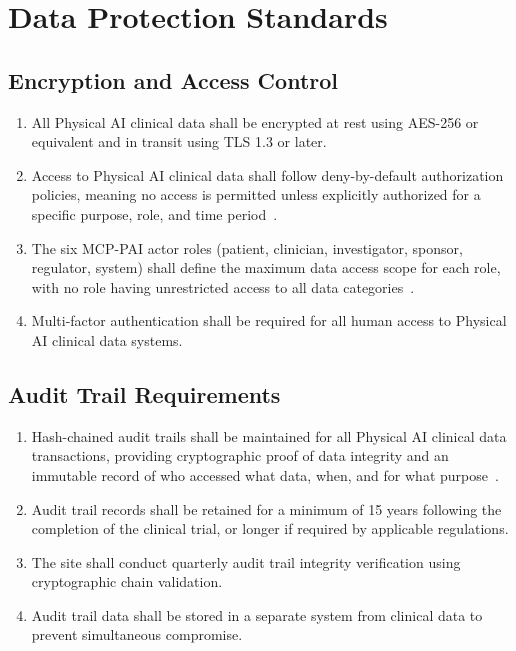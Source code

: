 \section{Data Protection Standards}

\subsection{Encryption and Access Control}

\begin{enumerate}[label=(\alph*)]
\item All Physical AI clinical data shall be encrypted at rest using AES-256 or
  equivalent and in transit using TLS 1.3 or later.

\item Access to Physical AI clinical data shall follow deny-by-default
  authorization policies, meaning no access is permitted unless explicitly
  authorized for a specific purpose, role, and time period~\cite{iche6r3adapt}.

\item The six MCP-PAI actor roles (patient, clinician, investigator, sponsor,
  regulator, system) shall define the maximum data access scope for each
  role, with no role having unrestricted access to all data
  categories~\cite{iche6r3adapt}.

\item Multi-factor authentication shall be required for all human access to
  Physical AI clinical data systems.
\end{enumerate}

\subsection{Audit Trail Requirements}

\begin{enumerate}[label=(\alph*)]
\item Hash-chained audit trails shall be maintained for all Physical AI clinical
  data transactions, providing cryptographic proof of data integrity and an
  immutable record of who accessed what data, when, and for what
  purpose~\cite{iche6r3adapt}.

\item Audit trail records shall be retained for a minimum of 15 years following
  the completion of the clinical trial, or longer if required by applicable
  regulations.

\item The site shall conduct quarterly audit trail integrity verification using
  cryptographic chain validation.

\item Audit trail data shall be stored in a separate system from clinical data
  to prevent simultaneous compromise.
\end{enumerate}

